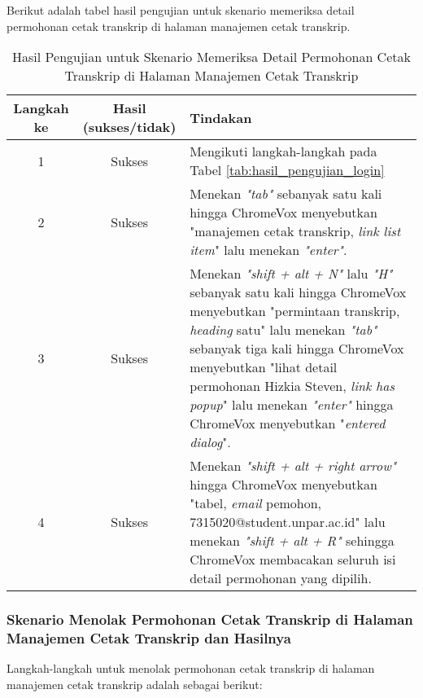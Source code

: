 Berikut adalah tabel hasil pengujian untuk skenario memeriksa detail permohonan cetak transkrip di halaman manajemen cetak transkrip.

\begin{table}[H]
    \centering 
    \caption{Hasil Pengujian untuk Skenario Memeriksa Detail Permohonan Cetak Transkrip di Halaman Manajemen Cetak Transkrip}
    \label{tab:hasil_pengujian_memeriksa_detail_permohonan_cetak_transkrip_di_halaman_manajemen_cetak_transkrip}
    \begin{tabular}{|c|c|p{10cm}|}
        \toprule
        Langkah ke & Hasil (sukses/tidak) & Tindakan \\

        \midrule
        1 & Sukses & Mengikuti langkah-langkah pada Tabel \ref{tab:hasil_pengujian_login} \\
        2 & Sukses & Menekan \textit{"tab"} sebanyak satu kali hingga ChromeVox menyebutkan "manajemen cetak transkrip, \textit{link list item}" lalu menekan \textit{"enter"}. \\
        3 & Sukses & Menekan \textit{"shift + alt + N"} lalu \textit{"H"} sebanyak satu kali hingga ChromeVox menyebutkan "permintaan transkrip, \textit{heading} satu" lalu menekan \textit{"tab"} sebanyak tiga kali hingga ChromeVox menyebutkan "lihat detail permohonan Hizkia Steven, \textit{link has popup}" lalu menekan \textit{"enter"} hingga ChromeVox menyebutkan "\textit{entered dialog}". \\
        4 & Sukses & Menekan \textit{"shift + alt + right arrow"} hingga ChromeVox menyebutkan "tabel, \textit{email} pemohon, 7315020@student.unpar.ac.id" lalu menekan \textit{"shift + alt + R"} sehingga ChromeVox membacakan seluruh isi detail permohonan yang dipilih. \\

        \bottomrule

    \end{tabular}
\end{table}

\subsubsection{Skenario Menolak Permohonan Cetak Transkrip di Halaman Manajemen Cetak Transkrip dan Hasilnya}
\label{subsubsec:skenario_menolak_permohonan_cetak_transkrip_di_halaman_manajemen_cetak_transkrip}
Langkah-langkah untuk menolak permohonan cetak transkrip di halaman manajemen cetak transkrip adalah sebagai berikut:

